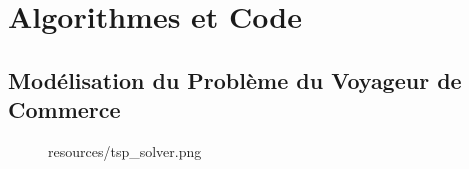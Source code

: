 \appendix
{}
\renewcommand{\thepage}{\Roman{page}}

\chapter{Algorithmes et Code}
\section{Modélisation du Problème du Voyageur de Commerce}
\label{app:tsp_model}

\begin{figure}[H]
    \centering
    \begin{includegraphics}[width=1\textwidth]{resources/tsp_solver.png}
    \end{includegraphics}
    
\end{figure}